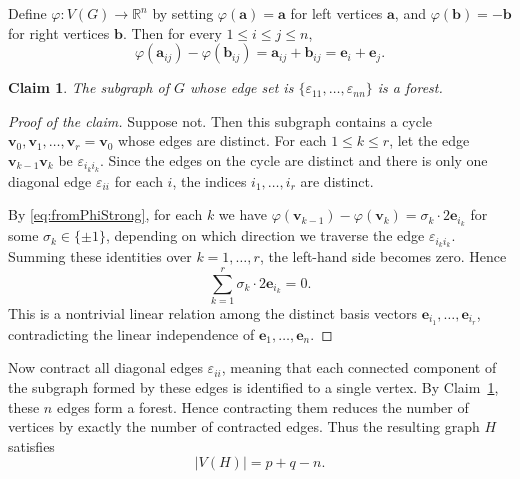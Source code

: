 \documentclass[11pt]{article}
\newtheorem{claim}[theorem]{Claim}
\theoremstyle{definition}
\newenvironment{poc}{\begin{proof}[Proof of the claim]\renewcommand*{\qedsymbol}{$\blacksquare$}}{\end{proof}}
\begin{document}
Define \(\varphi:V(G)\to \mathbb{R}^{n}\) by setting \(\varphi(\boldsymbol{a})=\boldsymbol{a}\) for left vertices \(\boldsymbol{a}\), and \(\varphi(\boldsymbol{b})=-\boldsymbol{b}\) for right vertices \(\boldsymbol{b}\). Then for every \(1\le i\le j\le n\),
\begin{equation}\label{eq:fromPhiStrong}
    \varphi(\boldsymbol{a}_{ij})-\varphi(\boldsymbol{b}_{ij})
    =\boldsymbol{a}_{ij}+\boldsymbol{b}_{ij}
    =\boldsymbol{e}_i+\boldsymbol{e}_j.
\end{equation}

\begin{claim}\label{claim:forest}
    The subgraph of \(G\) whose edge set is
    \(\{\varepsilon_{11},\dots,\varepsilon_{nn}\}\)
    is a forest.
\end{claim}
\begin{poc}
    Suppose not.  Then this subgraph contains a cycle \(\boldsymbol{v}_0,\boldsymbol{v}_1,\dots,\boldsymbol{v}_r=\boldsymbol{v}_0
    \)
    whose edges are distinct.  For each \(1\le k\le r\), let the edge
    \(\boldsymbol{v}_{k-1}\boldsymbol{v}_k\) be \(\varepsilon_{i_k i_k}\).
    Since the edges on the cycle are distinct and there is only one diagonal
    edge \(\varepsilon_{ii}\) for each \(i\), the indices
    \(i_1,\dots,i_r\) are distinct.

    By \eqref{eq:fromPhiStrong}, for each \(k\) we have
    \(
        \varphi(\boldsymbol{v}_{k-1})-\varphi(\boldsymbol{v}_k)
        =
        \sigma_k\cdot 2\boldsymbol{e}_{i_k}
    \)
    for some \(\sigma_k\in\{\pm1\}\), depending on which direction we traverse
    the edge \(\varepsilon_{i_k i_k}\).  Summing these identities over
    \(k=1,\dots,r\), the left-hand side becomes zero. Hence
    \[
        \sum_{k=1}^r \sigma_k\cdot 2\boldsymbol{e}_{i_k}=0.
    \]
    This is a nontrivial linear relation among the distinct basis vectors
    \(\boldsymbol{e}_{i_1},\dots,\boldsymbol{e}_{i_r}\), contradicting the
    linear independence of
    \(\boldsymbol{e}_1,\dots,\boldsymbol{e}_n\).
\end{poc}


Now contract all diagonal edges \(\varepsilon_{ii}\), meaning that each connected component of the subgraph formed by these edges is identified to a single vertex. By Claim~\ref{claim:forest}, these \(n\) edges form a forest. Hence contracting them reduces the number of vertices by exactly the number of contracted edges. Thus the resulting graph \(H\) satisfies
\begin{equation}\label{eq:fromForestStrong}
    |V(H)|=p+q-n.
\end{equation}
\end{document}
